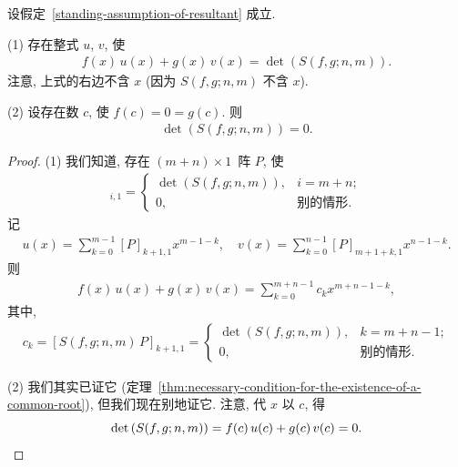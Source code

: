 \documentclass[../libro.tex]{subfiles}
\begin{document}
\begin{theorem}\label{thm:resultant-Bézout}
    设假定~\ref{standing-assumption-of-resultant} 成立.

    (1)
    存在整式 \(u\), \(v\), 使
    \begin{align*}
        f(x)\, u(x) + g(x)\, v(x) = \det {(S(f, g; n, m))}.
    \end{align*}
    注意, 上式的右边不含 \(x\)
    (因为 \(S(f, g; n, m)\) 不含 \(x\)).

    (2)
    设存在数 \(c\), 使 \(f(c) = 0 = g(c)\).
    则
    \begin{align*}
        \det {(S(f, g; n, m))} = 0.
    \end{align*}
\end{theorem}

\begin{proof}
    (1)
    我们知道, 存在 \((m + n) \times 1\)~阵 \(P\),
    使
    \begin{align*}
        [S(f, g; n, m)\, P]_{i,1} =
        \begin{cases}
            \det {(S(f, g; n, m))}, & i = m + n;   \\
            0,                      & \text{别的情形}.
        \end{cases}
    \end{align*}
    记
    \begin{align*}
        u(x) = \sum_{k = 0}^{m-1} {[P]_{k+1,1} x^{m-1-k}},
        \quad
        v(x) = \sum_{k = 0}^{n-1} {[P]_{m+1+k,1} x^{n-1-k}}.
    \end{align*}
    则
    \begin{align*}
        f(x)\, u(x) + g(x)\, v(x) = \sum_{k = 0}^{m+n-1} {c_k x^{m+n-1-k}},
    \end{align*}
    其中,
    \begin{align*}
        c_k = [S(f, g; n, m)\, P]_{k+1,1} =
        \begin{cases}
            \det {(S(f, g; n, m))}, & k = m + n - 1; \\
            0,                      & \text{别的情形}.
        \end{cases}
    \end{align*}

    (2)
    我们其实已证它
    (定理~\ref{thm:necessary-condition-for-the-existence-of-a-common-root}),
    但我们现在别地证它.
    注意, 代 \(x\) 以 \(c\), 得
    \begin{equation*}
        \det {(S(f, g; n, m))}
        = f(c)\, u(c) + g(c)\, v(c)
        = 0.
        \qedhere
    \end{equation*}
\end{proof}
\end{document}
